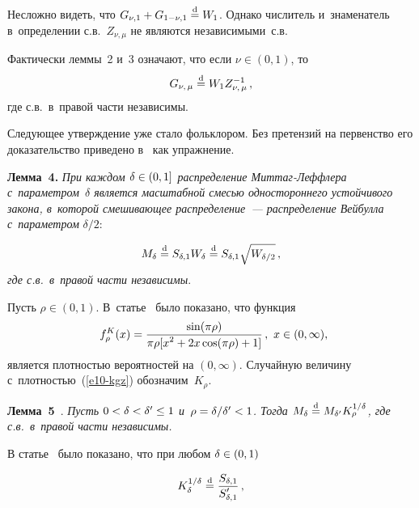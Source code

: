 \begin{multicols}{2}
\smallskip

Несложно видеть, что $G_{\nu,1}\hm+G_{1-\nu,1}\hm\eqd W_1$. Однако
числитель и~знаменатель в~определении с.в.~$Z_{\nu,\mu}$ не
являются независимыми~с.в.

\smallskip

Фактически леммы~2 и~3 означают, что если $\nu\in(0,1)$, то
\begin{equation}
G_{\nu,\,\mu}\stackrel{\mathrm{d}}{=} W_1  Z_{\nu,\,\mu}^{-1}\,,\label{e9-kgz}
\end{equation}
где с.в.\ в~правой части независимы.

\smallskip

Следующее утверждение уже стало фольклором. Без претензий на
первенство его доказательство приведено в~\cite{KorolevZeifmanKMJ}
как упражнение.

\smallskip

\noindent
\textbf{Лемма~4.} \textit{При каждом $\delta\hm\in(0,1]$ распределение
Мит\-таг-Леф\-фле\-ра с~параметром~$\delta$ является масштабной смесью
одностороннего устойчивого закона, в~которой смешивающее
распределение~--- распределение Вейбулла с~параметром}
$\delta/2$$:$ 

\noindent
$$
M_{\delta}\stackrel{\mathrm{d}}{=} S_{\delta,1}W_{\delta}\stackrel{\mathrm{d}}{=}
S_{\delta,1}\sqrt{W_{\delta/2}}\,,
$$
 \textit{где с.в.\ в~правой части
независимы}.

\smallskip

Пусть $\rho\in(0,1)$. В~статье~\cite{Kozubowski1998} было показано,
что функция
\begin{equation}
f_{\rho}^{K}(x)=\displaystyle\frac{\displaystyle \sin(\pi\rho)\mathstrut}{\displaystyle \pi\rho[x^2+2x\cos(\pi\rho)+1]\mathstrut}\,,\enskip\!
 x\in(0,\infty),\!\!\!\label{e10-kgz}
\end{equation}
является плотностью вероятностей на $(0,\infty)$. Случайную величину 
с~плот\-ностью~(\ref{e10-kgz}) обозначим~$K_{\rho}$.

\smallskip

\noindent
\textbf{Лемма~5}~\cite{Kozubowski1998}. \textit{Пусть
$0\hm<\delta\hm<\delta'\hm\le1$ и~$\rho\hm=\delta/\delta'\hm<1$. Тогда
$M_{\delta}\hm\eqd M_{\delta'}K_{\rho}^{1/\delta}$, где с.в.\ в~правой
части независимы.}

\smallskip

В статье~\cite{KorolevZeifmanKMJ} было показано, что при любом
$\delta\hm\in(0,1)$

\noindent
\begin{equation}
K_{\delta}^{1/\delta}\stackrel{\mathrm{d}}{=}
\displaystyle\frac{\displaystyle S_{\delta,1}\mathstrut}{\displaystyle S'_{\delta,1}\mathstrut}\,,\label{e11-kgz}
\end{equation}


\end{multicols}
